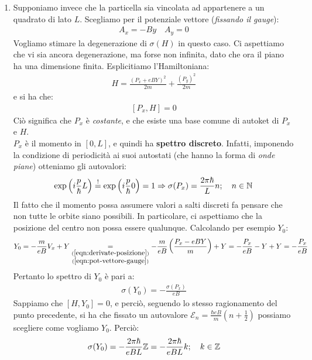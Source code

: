 \documentclass[../../FisicaTeorica.tex]{subfiles}
\begin{document}
\begin{enumerate}
\item Supponiamo invece che la particella sia vincolata ad appartenere a un quadrato di lato $L$. Scegliamo per il potenziale vettore (\textit{fissando il gauge}):
\begin{align}
A_x = -By\quad A_y = 0
\label{eqn:pot-vettore-gauge}
\end{align}
Vogliamo stimare la degenerazione di $\sigma(H)$ in questo caso. Ci aspettiamo che vi sia ancora degenerazione, ma forse non infinita, dato che ora il piano ha una dimensione finita. Esplicitiamo l'Hamiltoniana:
\begin{align*}
H=\frac{(P_x+eBY)^2}{2m} + \frac{(P_y)^2}{2m}
\end{align*}
e si ha che:
\begin{align*}
\left[P_x, H\right] =0
\end{align*}
Ciò significa che $P_x$ è \textit{costante}, e che esiste una base comune di autoket di $P_x$ e $H$.\\
$P_x$ è il momento in $[0, L]$, e quindi ha \textbf{spettro discreto}. Infatti, imponendo la condizione di periodicità ai suoi autostati (che hanno la forma di \textit{onde piane}) otteniamo gli autovalori:
\begin{align*}
\exp \left(i\frac{p}{\hbar}L\right)\overset{!}{=}\exp\left(i\frac{p}{\hbar}0\right)=1\Rightarrow \sigma(P_x)=\frac{2\pi\hbar}{L}n; \quad n \in \mathbb{N}
\end{align*}
Il fatto che il momento possa assumere valori a salti discreti fa pensare che non tutte le orbite siano possibili. In particolare, ci aspettiamo che la posizione del centro non possa essere qualunque. Calcolando per esempio $Y_0$:
\begin{align*}
Y_0 = -\frac{m}{eB} V_x + Y \underset{\substack{(\ref{eqn:derivate-posizione})\\(\ref{eqn:pot-vettore-gauge})}}{=} -\frac{m}{eB}\left(\frac{P_x-eBY}{m}\right) + Y = -\frac{P_x}{eB} -Y + Y = -\frac{P_x}{eB}
\end{align*}
Pertanto lo spettro di $Y_0$ è pari a:
\begin{align*}
\sigma(Y_0) = -\frac{\sigma(P_x)}{eB}
\end{align*}
Sappiamo che $[H, Y_0]=0$, e perciò, seguendo lo stesso ragionamento del punto precedente, si ha che fissato un autovalore $\mathcal{E}_n = \frac{\hbar e B}{m}\left(n+\frac{1}{2}\right)$ possiamo scegliere come vogliamo $Y_0$. Perciò:
\begin{align*}
\sigma(Y_0) = -\frac{2\pi \hbar}{eBL}\bb{Z}= -\frac{2\pi\hbar}{eBL}k; \quad k\in \bb{Z}

\end{align*}
\end{enumerate}
\end{document}
